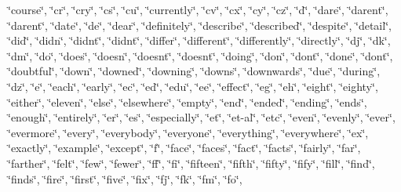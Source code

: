 \char`\"{}course\char`\"{}, \char`\"{}cr\char`\"{}, \char`\"{}cry\char`\"{}, \char`\"{}cs\char`\"{}, \char`\"{}cu\char`\"{}, \char`\"{}currently\char`\"{}, \char`\"{}cv\char`\"{}, \char`\"{}cx\char`\"{}, \char`\"{}cy\char`\"{}, \char`\"{}cz\char`\"{}, \char`\"{}d\char`\"{}, \char`\"{}dare\char`\"{}, \char`\"{}daren\textquotesingle{}t\char`\"{}, \char`\"{}darent\char`\"{}, \char`\"{}date\char`\"{}, \char`\"{}de\char`\"{}, \char`\"{}dear\char`\"{}, \char`\"{}definitely\char`\"{}, \char`\"{}describe\char`\"{}, \char`\"{}described\char`\"{}, \char`\"{}despite\char`\"{}, \char`\"{}detail\char`\"{}, \char`\"{}did\char`\"{}, \char`\"{}didn\char`\"{}, \char`\"{}didn\textquotesingle{}t\char`\"{}, \char`\"{}didnt\char`\"{}, \char`\"{}differ\char`\"{}, \char`\"{}different\char`\"{}, \char`\"{}differently\char`\"{}, \char`\"{}directly\char`\"{}, \char`\"{}dj\char`\"{}, \char`\"{}dk\char`\"{}, \char`\"{}dm\char`\"{}, \char`\"{}do\char`\"{}, \char`\"{}does\char`\"{}, \char`\"{}doesn\char`\"{}, \char`\"{}doesn\textquotesingle{}t\char`\"{}, \char`\"{}doesnt\char`\"{}, \char`\"{}doing\char`\"{}, \char`\"{}don\char`\"{}, \char`\"{}don\textquotesingle{}t\char`\"{}, \char`\"{}done\char`\"{}, \char`\"{}dont\char`\"{}, \char`\"{}doubtful\char`\"{}, \char`\"{}down\char`\"{}, \char`\"{}downed\char`\"{}, \char`\"{}downing\char`\"{}, \char`\"{}downs\char`\"{}, \char`\"{}downwards\char`\"{}, \char`\"{}due\char`\"{}, \char`\"{}during\char`\"{}, \char`\"{}dz\char`\"{}, \char`\"{}e\char`\"{}, \char`\"{}each\char`\"{}, \char`\"{}early\char`\"{}, \char`\"{}ec\char`\"{}, \char`\"{}ed\char`\"{}, \char`\"{}edu\char`\"{}, \char`\"{}ee\char`\"{}, \char`\"{}effect\char`\"{}, \char`\"{}eg\char`\"{}, \char`\"{}eh\char`\"{}, \char`\"{}eight\char`\"{}, \char`\"{}eighty\char`\"{}, \char`\"{}either\char`\"{}, \char`\"{}eleven\char`\"{}, \char`\"{}else\char`\"{}, \char`\"{}elsewhere\char`\"{}, \char`\"{}empty\char`\"{}, \char`\"{}end\char`\"{}, \char`\"{}ended\char`\"{}, \char`\"{}ending\char`\"{}, \char`\"{}ends\char`\"{}, \char`\"{}enough\char`\"{}, \char`\"{}entirely\char`\"{}, \char`\"{}er\char`\"{}, \char`\"{}es\char`\"{}, \char`\"{}especially\char`\"{}, \char`\"{}et\char`\"{}, \char`\"{}et-\/al\char`\"{}, \char`\"{}etc\char`\"{}, \char`\"{}even\char`\"{}, \char`\"{}evenly\char`\"{}, \char`\"{}ever\char`\"{}, \char`\"{}evermore\char`\"{}, \char`\"{}every\char`\"{}, \char`\"{}everybody\char`\"{}, \char`\"{}everyone\char`\"{}, \char`\"{}everything\char`\"{}, \char`\"{}everywhere\char`\"{}, \char`\"{}ex\char`\"{}, \char`\"{}exactly\char`\"{}, \char`\"{}example\char`\"{}, \char`\"{}except\char`\"{}, \char`\"{}f\char`\"{}, \char`\"{}face\char`\"{}, \char`\"{}faces\char`\"{}, \char`\"{}fact\char`\"{}, \char`\"{}facts\char`\"{}, \char`\"{}fairly\char`\"{}, \char`\"{}far\char`\"{}, \char`\"{}farther\char`\"{}, \char`\"{}felt\char`\"{}, \char`\"{}few\char`\"{}, \char`\"{}fewer\char`\"{}, \char`\"{}ff\char`\"{}, \char`\"{}fi\char`\"{}, \char`\"{}fifteen\char`\"{}, \char`\"{}fifth\char`\"{}, \char`\"{}fifty\char`\"{}, \char`\"{}fify\char`\"{}, \char`\"{}fill\char`\"{}, \char`\"{}find\char`\"{}, \char`\"{}finds\char`\"{}, \char`\"{}fire\char`\"{}, \char`\"{}first\char`\"{}, \char`\"{}five\char`\"{}, \char`\"{}fix\char`\"{}, \char`\"{}fj\char`\"{}, \char`\"{}fk\char`\"{}, \char`\"{}fm\char`\"{}, \char`\"{}fo\char`\"{}, 